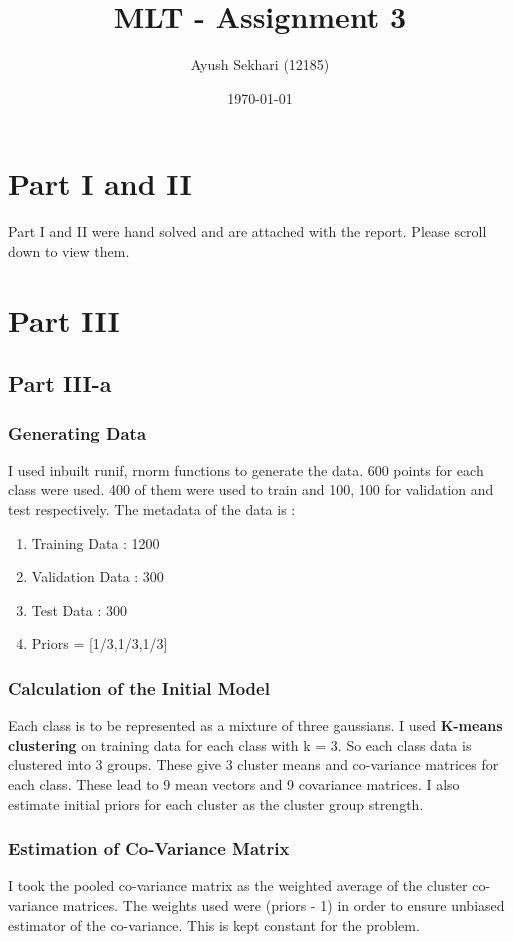 \documentclass[12pt]{article}%
\begin{document}
\title{MLT - Assignment 3 }
\author{Ayush Sekhari (12185)}
\date{\today}
\maketitle

\section{Part I and II}
Part I and II were hand solved and are attached with the report. Please scroll down to view them. 
\section{Part III}
\subsection{Part III-a}
\subsubsection{Generating Data}
I used inbuilt runif, rnorm functions to generate the data. 600 points for each class were used. 400 of them were used to train and 100, 100 for validation and test respectively. 
The metadata of the data is :
\begin{enumerate}    
\item Training Data : 1200
\item Validation Data : 300 
\item Test Data : 300
\item Priors = [1/3,1/3,1/3] 
\end{enumerate}


\subsubsection{Calculation of the Initial Model}
Each class is to be represented as a mixture of three gaussians. I used {\bf K-means clustering} on training data for each class with k = 3. So each class data is clustered into 3 groups. These give 3 cluster means and co-variance matrices for each class. 
These lead to 9 mean vectors and 9 covariance matrices. 
I also estimate initial priors for each cluster as the cluster group strength. 

\subsubsection{Estimation of Co-Variance Matrix}
I took the pooled co-variance matrix as the weighted average of the cluster co-variance matrices. The weights used were (priors - 1) in order to ensure unbiased estimator of the co-variance. This is kept constant for the problem. 
\end{document}
